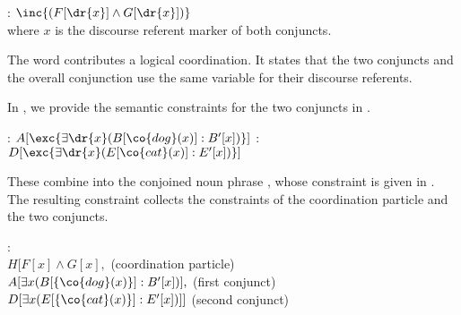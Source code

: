 \documentclass[output=paper]{langsci/langscibook}
\begin{document}

\ea \label{le-und1}
: $\inc{(F[\dr{x}] \land G[\dr{x}])}$\\
where $x$ is the discourse referent marker of both conjuncts.
\z 


The word  contributes a logical coordination. It states that the two conjuncts and the overall conjunction use the same variable for their discourse referents.

In , we provide the semantic constraints for the two conjuncts 
in .

\ea \label{le-hund-katze-schlaf}
\begin{xlist}
\ex {}: $A[\exc{\exists \dr{x} (B[\co{dog}(x)]: B'[x])}]$
\ex {}: $D[\exc{\exists \dr{x} (E[\co{cat}(x)]: E'[x])}]$
\end{xlist}
\z 

These combine into the conjoined noun phrase , whose constraint is given in . The resulting constraint collects the constraints of the coordination particle and the two conjuncts.


\ea \label{le-hund-und-katze}
:\\
$H[
F[x] \land G[x],$ \hfill (coordination particle)\\
$A[\exists x (B[\{\co{dog}(x)\}]: B'[x])],$ \hfill (first conjunct)\\
$D[\exists x (E[\{\co{cat}(x)\}]: E'[x])]]$ \hfill (second conjunct)
\z 
\end{document}
